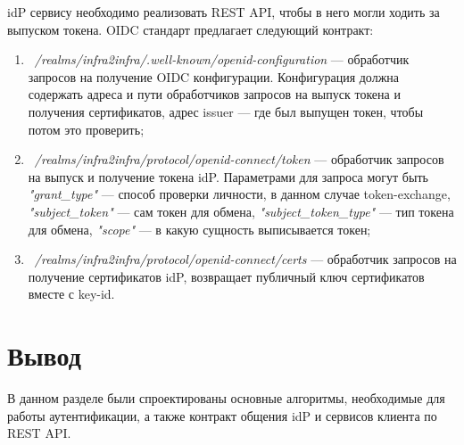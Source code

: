 idP сервису необходимо реализовать REST API, чтобы в него могли ходить за выпуском токена.
OIDC стандарт предлагает следующий контракт:

\begin{enumerate}
\item ~\textit{/realms/infra2infra/.well-known/openid-configuration} --- обработчик запросов на получение OIDC конфигурации. Конфигурация должна содержать адреса и пути обработчиков запросов на выпуск токена и получения сертификатов, адрес issuer --- где был выпущен токен, чтобы потом это проверить;
\item ~\textit{/realms/infra2infra/protocol/openid-connect/token} --- обработчик запросов на выпуск и получение токена idP. Параметрами для запроса могут быть \textit{"grant\_type"} --- способ проверки личности, в данном случае token-exchange, \textit{"subject\_token"} --- сам токен для обмена, \textit{"subject\_token\_type"} --- тип токена для обмена, \textit{"scope"} --- в какую сущность выписывается токен;
\item ~\textit{/realms/infra2infra/protocol/openid-connect/certs} --- обработчик запросов на получение сертификатов idP, возвращает публичный ключ сертификатов вместе с key-id.
\end{enumerate}

\section*{Вывод}
В данном разделе были спроектированы основные алгоритмы, необходимые для работы аутентификации, а также контракт общения idP и сервисов клиента по REST API.